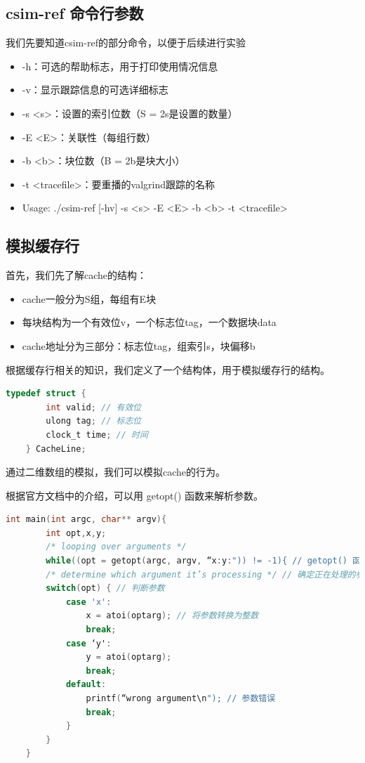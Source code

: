 \subsection{csim-ref 命令行参数}
我们先要知道csim-ref的部分命令，以便于后续进行实验
\begin{itemize}
    \item -h：可选的帮助标志，用于打印使用情况信息
    \item -v：显示跟踪信息的可选详细标志
    \item -s <s>：设置的索引位数（S = 2s是设置的数量）
    \item -E <E>：关联性（每组行数）
    \item -b <b>：块位数（B = 2b是块大小）
    \item -t <tracefile>：要重播的valgrind跟踪的名称
    \item Usage: ./csim-ref [-hv] -s <s> -E <E> -b <b> -t <tracefile>
\end{itemize}

\subsection{模拟缓存行}
首先，我们先了解cache的结构：
\begin{itemize}
    \item cache一般分为S组，每组有E块
    \item 每块结构为一个有效位v，一个标志位tag，一个数据块data
    \item cache地址分为三部分：标志位tag，组索引s，块偏移b
\end{itemize}

根据缓存行相关的知识，我们定义了一个结构体，用于模拟缓存行的结构。

\begin{lstlisting}[language = C , title = { Struct Definition } ]
    typedef struct {
        int valid; // 有效位
        ulong tag; // 标志位
        clock_t time; // 时间
    } CacheLine;
\end{lstlisting}

通过二维数组的模拟，我们可以模拟cache的行为。

根据官方文档中的介绍，可以用 getopt() 函数来解析参数。

\begin{lstlisting}[language = C , title = { Getopt Function } ]
    int main(int argc, char** argv){
        int opt,x,y;
        /* looping over arguments */
        while((opt = getopt(argc, argv, “x:y:")) != -1){ // getopt() 函数解析参数
        /* determine which argument it’s processing */ // 确定正在处理的参数
        switch(opt) { // 判断参数
            case 'x':
                x = atoi(optarg); // 将参数转换为整数
                break;
            case ‘y':
                y = atoi(optarg); 
                break;
            default:
                printf(“wrong argument\n"); // 参数错误
                break;
            }
        }
    }
\end{lstlisting}

